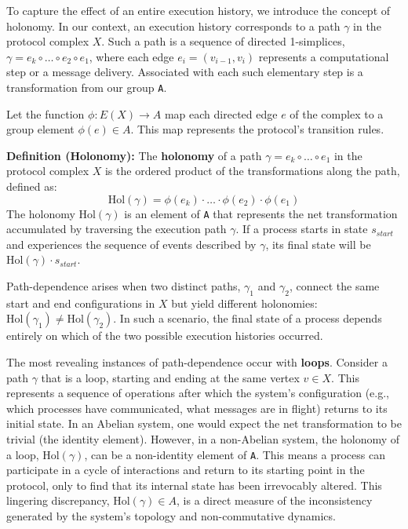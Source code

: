 \documentclass[
]{article}
\begin{document}
To capture the effect of an entire execution history, we introduce the
concept of holonomy. In our context, an execution history corresponds to
a path \(\gamma\) in the protocol complex \(X\). Such a path is a
sequence of directed 1-simplices,
\(\gamma = e_k \circ \dots \circ e_2 \circ e_1\), where each edge
\(e_i = (v_{i-1}, v_i)\) represents a computational step or a message
delivery. Associated with each such elementary step is a transformation
from our group \texttt{A}.

Let the function \(\phi: E(X) \to A\) map each directed edge \(e\) of
the complex to a group element \(\phi(e) \in A\). This map represents
the protocol's transition rules.

\textbf{Definition (Holonomy):} The \textbf{holonomy} of a path
\(\gamma = e_k \circ \dots \circ e_1\) in the protocol complex \(X\) is
the ordered product of the transformations along the path, defined as:
\[ \text{Hol}(\gamma) = \phi(e_k) \cdot \dots \cdot \phi(e_2) \cdot \phi(e_1) \]
The holonomy \(\text{Hol}(\gamma)\) is an element of \texttt{A} that
represents the net transformation accumulated by traversing the
execution path \(\gamma\). If a process starts in state \(s_{start}\)
and experiences the sequence of events described by \(\gamma\), its
final state will be \(\text{Hol}(\gamma) \cdot s_{start}\).

Path-dependence arises when two distinct paths, \(\gamma_1\) and
\(\gamma_2\), connect the same start and end configurations in \(X\) but
yield different holonomies:
\(\text{Hol}(\gamma_1) \neq \text{Hol}(\gamma_2)\). In such a scenario,
the final state of a process depends entirely on which of the two
possible execution histories occurred.

The most revealing instances of path-dependence occur with
\textbf{loops}. Consider a path \(\gamma\) that is a loop, starting and
ending at the same vertex \(v \in X\). This represents a sequence of
operations after which the system's configuration (e.g., which processes
have communicated, what messages are in flight) returns to its initial
state. In an Abelian system, one would expect the net transformation to
be trivial (the identity element). However, in a non-Abelian system, the
holonomy of a loop, \(\text{Hol}(\gamma)\), can be a non-identity
element of \texttt{A}. This means a process can participate in a cycle
of interactions and return to its starting point in the protocol, only
to find that its internal state has been irrevocably altered. This
lingering discrepancy, \(\text{Hol}(\gamma) \in A\), is a direct measure
of the inconsistency generated by the system's topology and
non-commutative dynamics.
\end{document}
